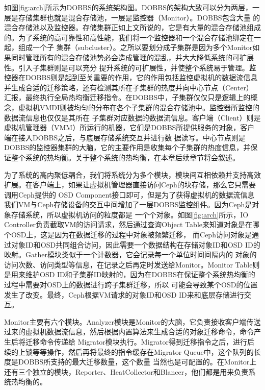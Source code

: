如图\ref{fig:arch}所示为DOBBS的系统架构图。DOBBS的架构大致可以分为两层，一层是存储集群也就是混合存储池，一层是监控器（Monitor）。DOBBS包含大量
的混合存储池以及监控器。存储集群正如上文所说的，它是有大量的混合存储池组成的。为了系统的高可靠性和高性能，我们将一个监控器和一个混合存储池绑定在一起，组成一个子
集群（subcluster）。之所以要划分成子集群是因为多个Monitor如果同时管理所有的混合存储池势必会造成管理的混乱，并大大降低系统的可扩展性。引入子集群则是可以充分
提升系统的可扩展性，并使整个系统易于管理。监控器在DOBBS则是起到至关重要的作用，它的作用包括监控虚拟机的数据流信息并生成合适的迁移策略，还有检测其所在子集群的热度并向中心节点（Center）
汇报，最终执行全局热均衡迁移指令。在DOBBS中，子集群仅仅只是逻辑上的概念，虚拟机VMDI则被均匀的分布在各个子集群的混合存储池中。监控器所监控的数据流信息也仅仅是其所在
子集群对应数据的数据流信息。客户端（Client）则是虚拟机管理器（VMM）所运行的机器，它们是DOBBS所提供服务的对象，客户端在接入DOBBS之后，与底层存储系统交互并进行数
据读写。中心节点则是DOBBS的监控器集群的大脑，它的主要作用是收集每个子集群的热度信息，并保证整个系统的热均衡。关于整个系统的热均衡，在本章后续章节将会叙述。

为了系统的高内聚低耦合，我们将系统分为多个模块，模块间互相依赖并支持高效扩展。在客户端上，如果让虚拟机管理器直接访问Ceph的块存储，那么它只需要调用Ceph提供的
OSD Component接口即可，但是为了获得虚拟机的数据流信息我们VM与Ceph存储设备的交互中间增加了一层DOBBS监控组件。因为Ceph是对象存储系统，所以虚拟机访问的粒度都是
一个个对象。如图\ref{fig:arch}所示，IO Controller负责截取VM的访问请求，然后通过查询Object Table来知道对象是在哪个OSD上，这是因为在数据迁移的过程中对象被频繁迁移，
而Ceph访问对象是通过对象ID和OSD共同组合访问，因此需要一个数据结构在存储对象ID和OSD ID的映射。Gather模块类似于一个计数器，它会记录每一个单位时间间隔内的
对象的访问次数、访问类型等信息，在记录之后再定时发送给Monitor。Monitor Table则是用来维护OSD ID和子集群ID映射的，因为在DOBBS在保证整个系统热均衡的过程中需要对OSD上的数据进行跨子集群迁移，所以
可能会导致某个OSD的位置发生了改变。最终，Ceph根据VM请求的对象ID和OSD ID来和底层存储进行交互。

Monitor主要有六个模块。Analyzer模块是Monitor的大脑，它负责接收客户端传送过来的虚拟机数据流信息，然后根据内置算法来生成合适的对象迁移命令，命令产生后将迁移命令传递给
Migrator模块执行。Migrator得到迁移指令之后，进行后续的上锁等等操作，然后再将最终的指令缓存在Migrator Queue中，这个队列的长度是DOBBS所支持的最大迁移数量，这个数量
当然也是可配置的。在Monitor上还有三个独立的模块，Reporter、HeatCollector和Blancer，他们都是用来负责系统热均衡的。

